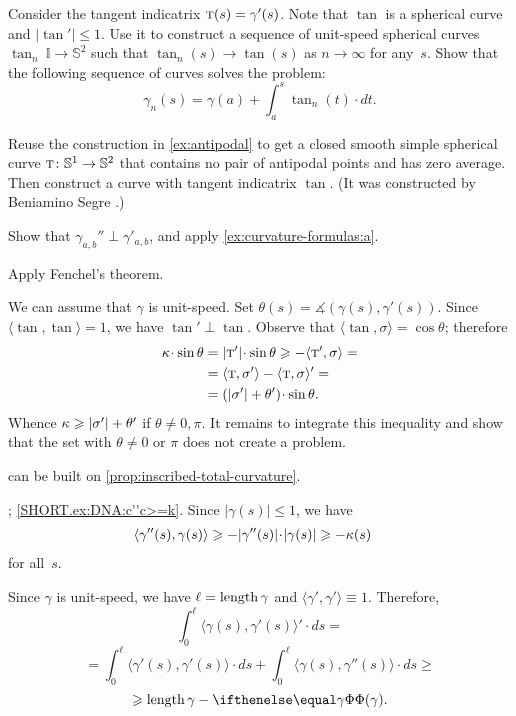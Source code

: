 \begin{multicols}{2}
Consider the tangent indicatrix $\tan(s)\z=\gamma'(s)$.
Note that $\tan$ is a spherical curve and $|\tan'|\le 1$.
Use it to construct a sequence of unit-speed spherical curves $\tan_n\:\mathbb{I}\to\mathbb{S}^2$ such that $\tan_n(s)\to \tan(s)$ as $n\to\infty$ for any~$s$.
Show that the following sequence of curves solves the problem:
\[\gamma_n(s)=\gamma(a)+\int_a^s\tan_n(t)\cdot dt.\]

Reuse the construction in \ref{ex:antipodal} to get a closed smooth simple spherical curve $\tan\:\mathbb{S}^1\z\to\mathbb{S}^2$ that contains no pair of antipodal points and has zero average.
Then construct a curve with tangent indicatrix $\tan$.
(It was constructed by Beniamino Segre \cite{segre}.)

Show that $\gamma_{a,b}''\perp \gamma'_{a,b}$, and apply \ref{ex:curvature-formulas:a}.

 Apply Fenchel's theorem.

We can assume that $\gamma$ is unit-speed.
Set $\theta(s)=\measuredangle(\gamma(s),\gamma'(s))$.
Since $\langle\tan,\tan\rangle=1$, we have $\tan'\perp \tan$.
Observe that $\langle \tan,\sigma\rangle=\cos\theta$;
therefore
\begin{align*}
\kur\cdot \sin\theta
&=|\tan'|\cdot \sin\theta\ge
-\langle \tan',\sigma\rangle=
\\
&=
\langle \tan,\sigma'\rangle-\langle \tan,\sigma\rangle'=
\\
&=
(|\sigma'|+\theta')\cdot \sin\theta.
\end{align*}
Whence $\kappa\geqslant |\sigma'|+\theta'$
if $\theta\ne0,\pi$.
It remains to integrate this inequality and show that the set with $\theta\ne0$ or $\pi$ does not create a problem.

 can be built on \ref{prop:inscribed-total-curvature}.

\parbf{\ref{ex:DNA}}; \ref{SHORT.ex:DNA:c''c>=k}.
Since $|\gamma(s)|\le 1$, we have
\begin{align*}
\langle\gamma''(s),\gamma(s)\rangle&\ge -|\gamma''(s)|\cdot|\gamma(s)|\ge-\kur(s)
\end{align*}
for all~$s$.

Since $\gamma$ is unit-speed, we have $\ell=\mathop{\rm length}\nolimits\gamma$ and $\langle\gamma',\gamma'\rangle\equiv1$.
Therefore,
\[\int_0^\ell\langle\gamma(s),\gamma'(s)\rangle'\cdot ds
=\]
\[=\int_0^\ell\langle\gamma'(s),\gamma'(s)\rangle\cdot ds+\int_0^\ell\langle\gamma(s),\gamma''(s)\rangle\cdot ds\ge\]
\[\ge \length\gamma-\tc\gamma.\]



\end{multicols}
